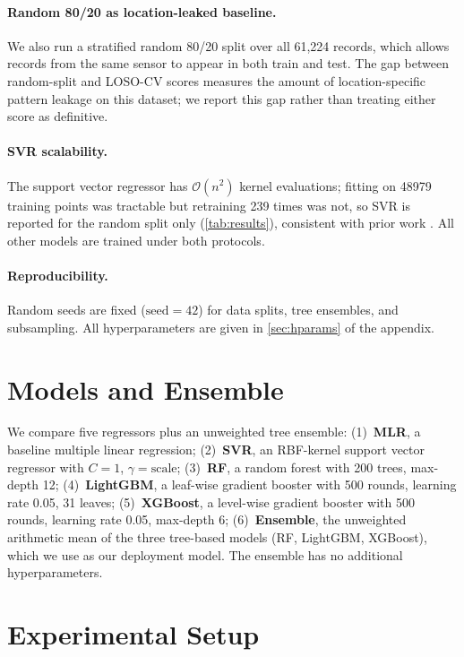 \documentclass{article}
\begin{document}
\paragraph{Random 80/20 as location-leaked baseline.} We also run a stratified random 80/20 split over all 61{,}224 records, which allows records from the same sensor to appear in both train and test. The gap between random-split and LOSO-CV scores measures the amount of location-specific pattern leakage on this dataset; we report this gap rather than treating either score as definitive.

\paragraph{SVR scalability.} The support vector regressor has $\mathcal{O}(n^2)$ kernel evaluations; fitting on \num{48979} training points was tractable but retraining 239 times was not, so SVR is reported for the random split only (\autoref{tab:results}), consistent with prior work \citep{ghahremanloo2021}. All other models are trained under both protocols.

\paragraph{Reproducibility.} Random seeds are fixed ($\mathrm{seed}=42$) for data splits, tree ensembles, and subsampling. All hyperparameters are given in \autoref{sec:hparams} of the appendix.

\section{Models and Ensemble}
\label{sec:models}

We compare five regressors plus an unweighted tree ensemble:
(1)~\textbf{MLR}, a baseline multiple linear regression;
(2)~\textbf{SVR}, an RBF-kernel support vector regressor with $C=1$, $\gamma=\mathrm{scale}$;
(3)~\textbf{RF}, a random forest with 200 trees, max-depth 12;
(4)~\textbf{LightGBM}, a leaf-wise gradient booster with 500 rounds, learning rate 0.05, 31 leaves;
(5)~\textbf{XGBoost}, a level-wise gradient booster with 500 rounds, learning rate 0.05, max-depth 6;
(6)~\textbf{Ensemble}, the unweighted arithmetic mean of the three tree-based models (RF, LightGBM, XGBoost), which we use as our deployment model. The ensemble has no additional hyperparameters.

\section{Experimental Setup}
\end{document}
